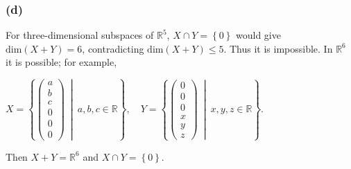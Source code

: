 \subsubsection{(d)}

For three-dimensional subspaces of \(\mathbb{R}^{5}\), \(X \cap Y = \left\{ 0 \right\}\) would give \(\text{dim}\left( {X + Y} \right) = 6\), contradicting \(\text{dim}\left( {X + Y} \right) \leq 5\). Thus it is impossible. In \(\mathbb{R}^{6}\) it is possible; for example,

\(X = \left\{ \begin{pmatrix}
a \\
b \\
c \\
0 \\
0 \\
0
\end{pmatrix}\  \middle| \ a,b,c \in \mathbb{R} \right\},\quad Y = \left\{ \begin{pmatrix}
0 \\
0 \\
0 \\
x \\
y \\
z
\end{pmatrix}\  \middle| \ x,y,z \in \mathbb{R} \right\}.\)

Then \(X + Y = \mathbb{R}^{6}\) and \(X \cap Y = \left\{ 0 \right\}\).
